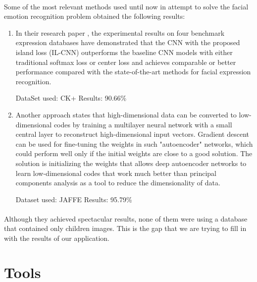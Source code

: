 \documentclass[runningheads,a4paper,11pt]{report}
\begin{document}
\paragraph{}
Some of the most relevant methods used until now in attempt to solve the facial emotion recognition problem obtained the following results:
\begin{enumerate}
  \item In their research paper \cite{Cai2018}, the experimental results on four benchmark expression databases have demonstrated that the CNN with the proposed island loss (IL-CNN) outperforms the baseline CNN models with either traditional softmax loss or center loss and achieves comparable or better performance compared with the state-of-the-art methods for facial expression recognition.
  
  DataSet used: CK+
  Results: 90.66\%
  \item Another approach \cite{Hinton2006} states that high-dimensional data can be converted to low-dimensional codes by training a multilayer neural network with a small central layer to reconstruct high-dimensional input vectors. Gradient descent can be used for fine-tuning the weights in such "autoencoder" networks, which could perform well only if the initial weights are close to a good solution. The solution is initializing the weights that allows deep autoencoder networks to learn low-dimensional codes that work much better than principal components analysis as a tool to reduce the dimensionality of data.
  
  Dataset used: JAFFE
  Results: 95.79\%
\end{enumerate}
\paragraph{}
Although they achieved spectacular results, none of them were using a database that contained only children images. This is the gap that we are trying to fill in with the results of our application.

\section{Tools}
\end{document}

